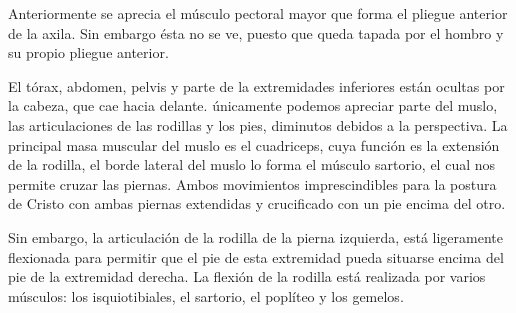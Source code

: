Anteriormente se aprecia el músculo pectoral mayor que forma el pliegue anterior de la axila. Sin embargo ésta no se ve, puesto que queda tapada por el hombro y su propio pliegue anterior.

El tórax, abdomen, pelvis y parte de la extremidades inferiores están ocultas por la cabeza, que cae hacia delante. únicamente podemos apreciar parte del muslo, las articulaciones de las rodillas y los pies, diminutos debidos a la perspectiva. La principal masa muscular del muslo es el cuadriceps, cuya función es la extensión de la rodilla, el borde lateral del muslo lo forma el músculo sartorio, el cual nos permite cruzar las piernas. Ambos movimientos imprescindibles para la postura de Cristo con ambas piernas extendidas y crucificado con un pie encima del otro.

Sin embargo, la articulación de la rodilla de la pierna izquierda, está ligeramente flexionada para permitir que el pie de esta extremidad pueda situarse encima del pie de la extremidad derecha. La flexión de la rodilla está realizada por varios músculos: los isquiotibiales, el sartorio, el poplíteo y los gemelos.
